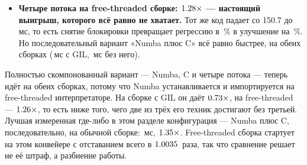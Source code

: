 \begin{itemize}[leftmargin=1.4em,itemsep=1pt]
        --- это байткод уровня Python, поэтому GIL его сериализует, а нарезка на части и управление
        потоками остаются чистыми накладными расходами.
  \item \textbf{Четыре потока на free-threaded сборке: $\meas{ratio:b7_pipeline-ft:end_to_end/ft/v0_pure|b7_pipeline-ft:end_to_end/ft/v3_native_threads}{1.28}\times$ --- настоящий выигрыш,
        которого всё равно не хватает.} Тот же код падает со 150.7 до \,мс, то есть снятие
        блокировки превращает регрессию в \,\% в улучшение на \,\%. Но последовательный вариант
        «Numba плюс C» всё равно быстрее, на обеих сборках (\,мс с GIL, \,мс без него).
\end{itemize}

Полностью скомпонованный вариант --- Numba, C и четыре потока --- теперь идёт на обеих сборках,
потому что Numba устанавливается и импортируется на free-threaded интерпретаторе. На сборке с GIL
он даёт $\meas{ratio:b7_pipeline-gil:end_to_end/gil/v0_pure|b7_pipeline-gil:end_to_end/gil/v4_all}{0.73}\times$, на free-threaded --- $\meas{ratio:b7_pipeline-ft:end_to_end/ft/v0_pure|b7_pipeline-ft:end_to_end/ft/v4_all}{1.26}\times$, то есть ниже того, чего две из трёх его
техник достигают без третьей. Лучшая измеренная где-либо в этом разделе конфигурация --- Numba плюс
C, последовательно, на обычной сборке: \,мс, $\meas{ratio:b7_pipeline-gil:end_to_end/gil/v0_pure|b7_pipeline-gil:end_to_end/gil/v2_numba_native}{1.35}\times$. Free-threaded сборка стартует на
этом конвейере с отставанием всего в $\meas{ratio:b7_pipeline-ft:end_to_end/ft/v0_pure|b7_pipeline-gil:end_to_end/gil/v0_pure}{1.0035}$~раза, так что сравнение решает не её штраф, а
разбиение работы.

